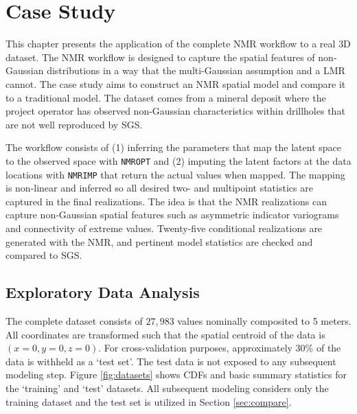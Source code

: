
\chapter{Case Study}
\label{ch:casestudy}

This chapter presents the application of the complete \gls{NMR} workflow to a real \gls{3D} dataset. The \gls{NMR} workflow is designed to capture the spatial features of non‐Gaussian distributions in a way that the multi-Gaussian assumption and a \gls{LMR} cannot. The case study aims to construct an \gls{NMR} spatial model and compare it to a traditional model. The dataset comes from a mineral deposit where the project operator has observed non-Gaussian characteristics within drillholes that are not well reproduced by \gls{SGS}.

The workflow consists of (1) inferring the parameters that map the latent space to the observed space with \texttt{NMROPT} and (2) imputing the latent factors at the data locations with \texttt{NMRIMP} that return the actual values when mapped. The mapping is non-linear and inferred so all desired two- and multipoint statistics are captured in the final realizations. The idea is that the \gls{NMR} realizations can capture non-Gaussian spatial features such as asymmetric indicator variograms and connectivity of extreme values. Twenty-five conditional realizations are generated with the \gls{NMR}, and pertinent model statistics are checked and compared to \gls{SGS}.

\FloatBarrier
\section{Exploratory Data Analysis}
\label{sec:eda}

The complete dataset consists of $27,983$ values nominally composited to 5 meters. All coordinates are transformed such that the spatial centroid of the data is $(x=0,y=0,z=0)$. For cross-validation purposes, approximately 30\% of the data is withheld as a `test set'. The test data is not exposed to any subsequent modeling step. Figure \ref{fig:datasets} shows \glspl{CDF} and basic summary statistics for the `training' and `test' datasets. All subsequent modeling considers only the training dataset and the test set is utilized in Section \ref{sec:compare}.

